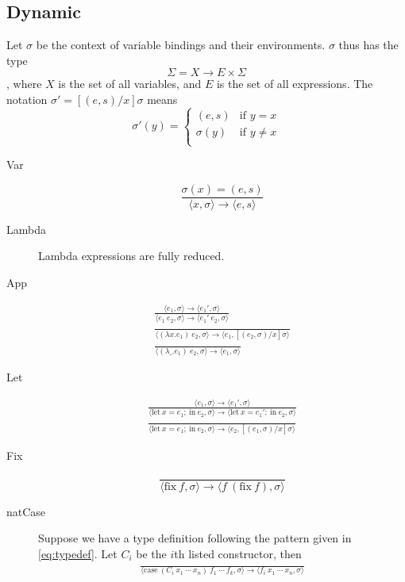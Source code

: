 \documentclass[12pt]{article}
\newcommand{\env}[1]{\langle #1 \rangle}
\begin{document}
\subsection{Dynamic}
\label{sec:dynamic_sem}

Let $\sigma$ be the context of variable bindings and their
environments.
$\sigma$ thus has the type
$$\Sigma = X \to E \times \Sigma$$, where $X$ is the
set of all variables, and $E$ is the set of all expressions.
The notation $\sigma' = [(e, s)/x]\sigma$ means
$$\sigma'(y) =
\begin{cases}
  (e, s) &\text{if } y = x\\
  \sigma(y) &\text{if } y \neq x\\
\end{cases}$$

\begin{description}
\item[Var]
  \begin{equation}
\frac{\sigma(x) = (e, s)}{\env{x, \sigma} \to \env{e, s}}
\end{equation}

\item[Lambda] Lambda expressions are fully reduced.

\item[App] 
  \begin{gather}
    \frac{\env{e_1, \sigma} \to \env{e_1', \sigma}}{\env{e_1~e_2, \sigma} \to \env{e_1'~e_2, \sigma}}\\
    \frac{}{\env{(\lambda x. e_1)~e_2, \sigma} \to \env{e_1, [(e_2, \sigma)/x]\sigma}}\\
    \frac{}{\env{(\lambda \_. e_1)~e_2, \sigma} \to \env{e_1, \sigma}}
  \end{gather}

\item[Let]
  \begin{gather}
    \frac{\env{e_1, \sigma} \to \env{e_1', \sigma}}{\env{\mathrm{let}~x = e_1;~\mathrm{in}~e_2, \sigma} \to \env{\mathrm{let}~x = e_1';~\mathrm{in}~e_2, \sigma}}\\
    \frac{}{\env{\mathrm{let}~x = e_1;~\mathrm{in}~e_2, \sigma} \to \env{e_2, [(e_1, \sigma)/x]\sigma}}
  \end{gather}

\item[Fix]
  \begin{equation}
    \frac{}{\env{\mathrm{fix}~f, \sigma} \to \env{f~(\mathrm{fix}~f), \sigma}}
  \end{equation}

\item[natCase] Suppose we have a type definition following the pattern
  given in \eqref{eq:typedef}.
  Let $C_i$ be the $i$th listed constructor, then
  \begin{gather}
    \frac{}{\env{\mathrm{case}~(C_i~x_1~\cdots~x_n)~f_1~\cdots~f_k, \sigma} \to \env{f_i~x_1~\cdots~x_n, \sigma}}\\
  \end{gather}
\end{description}
\end{document}
